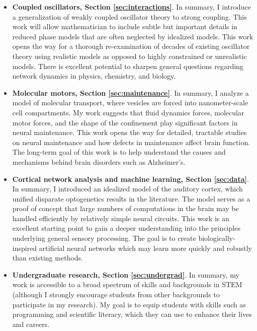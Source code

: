 \documentclass[a4paper,11pt]{article}
\begin{document}
\begin{itemize}
	\item \textbf{Coupled oscillators, Section \ref{sec:interactions}}. In summary, I introduce a generalization of weakly coupled oscillator theory to strong coupling. This work will allow mathematician to include subtle but important details in reduced phase models that are often neglected by idealized models. This work opens the way for a thorough re-examination of decades of existing oscillator theory using realistic models as opposed to highly constrained or unrealistic models. There is excellent potential to sharpen general questions regarding network dynamics in physics, chemistry, and biology.
	\item \textbf{Molecular motors, Section \ref{sec:maintenance}}. In summary, I analyze a model of molecular transport, where vesicles are forced into nanometer-scale cell compartments. My work suggests that fluid dynamics forces, molecular motor forces, and the shape of the confinement play significant factors in neural maintenance. This work opens the way for detailed, tractable studies on neural maintenance and how defects in maintenance affect brain function. The long-term goal of this work is to help understand the causes and mechanisms behind brain disorders such as Alzheimer's.
	\item \textbf{Cortical network analysis and machine learning, Section \ref{sec:data}}. In summary, I introduced an idealized model of the auditory cortex, which unified disparate optogenetics results in the literature. The model serves as a proof of concept that large numbers of computations in the brain may be handled efficiently by relatively simple neural circuits. This work is an excellent starting point to gain a deeper understanding into the principles underlying general sensory processing. The goal is to create biologically-inspired artificial neural networks which may learn more quickly and robustly than existing methods.
	\item \textbf{Undergraduate research, Section \ref{sec:undergrad}}. In summary, my work is accessible to a broad spectrum of skills and backgrounds in STEM (although I strongly encourage students from other backgrounds to participate in my research). My goal is to equip students with skills such as programming and scientific literacy, which they can use to enhance their lives and careers.
\end{itemize}
\end{document}
